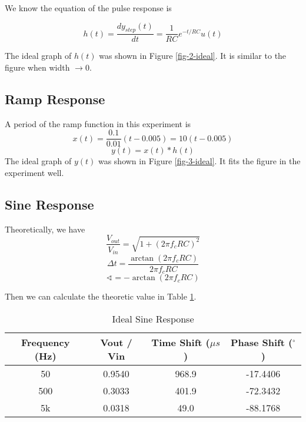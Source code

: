 \documentclass{article}
\begin{document}
We know the equation of the pulse response is

$$h(t)=\frac{dy_{step}(t)}{dt}=\frac{1}{RC}e^{-t/RC}u(t)$$

The ideal graph of $h(t)$ was shown in Figure \ref{fig-2-ideal}. It is similar to the figure when width $\to 0$.


\newpage

\subsection{Ramp Response}

A period of the ramp function in this experiment is
$$x(t)=\frac{0.1}{0.01}(t-0.005)=10(t-0.005)$$
$$y(t)=x(t)*h(t)$$
The ideal graph of $y(t)$ was shown in Figure \ref{fig-3-ideal}. It fits the figure in the experiment well.


\subsection{Sine Response}

Theoretically, we have
$$\frac{V_{out}}{V_{in}}=\sqrt{1+(2\pi f_cRC)^2}$$
$$\Delta t=\frac{\arctan(2\pi f_cRC)}{2\pi f_cRC}$$
$$\sphericalangle=-\arctan(2\pi f_cRC)$$

Then we can calculate the theoretic value in Table \ref{tab-4-ideal}.

\begin{table}[htbp]
	\centering
	\begin{tabular}{|c|c|c|c|}
		\hline
		Frequency (Hz) & Vout / Vin & Time Shift ($\mu s$) & Phase Shift ($^\circ$) \\
		\hline
		50 & 0.9540 & 968.9 & -17.4406 \\
		\hline
		500 & 0.3033 & 401.9 & -72.3432 \\
		\hline
		5k & 0.0318& 49.0 & -88.1768\\
		\hline
	\end{tabular}
	\caption{Ideal Sine Response}
	\label{tab-4-ideal}
\end{table}
\end{document}
